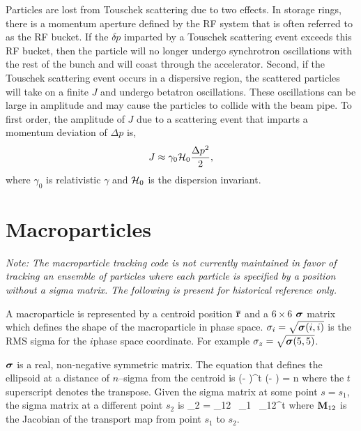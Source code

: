 Particles are lost from Touschek scattering due to two effects.  In storage rings, there is a
momentum aperture defined by the RF system that is often referred to as the RF bucket.  If the
$\delta p$ imparted by a Touschek scattering event exceeds this RF bucket, then the particle will no
longer undergo synchrotron oscillations with the rest of the bunch and will coast through the
accelerator.  Second, if the Touschek scattering event occurs in a dispersive region, the scattered
particles will take on a finite $J$ and undergo betatron oscillations.  These oscillations can be
large in amplitude and may cause the particles to collide with the beam pipe.  To first order, the
amplitude of $J$ due to a scattering event that imparts a momentum deviation of $\Delta p$ is,
\begin{equation}
  J\approx\gamma_0{\cal H}_0\frac{\Delta p^2}{2},
\end{equation}
where $\gamma_0$ is relativistic $\gamma$ and ${\cal H}_0$ is the dispersion invariant.

\section{Macroparticles}
\label{s:macro}

{\em Note: The macroparticle tracking code is not currently maintained in favor of tracking an
ensemble of particles where each particle is specified by a position without a sigma matrix. The
following is present for historical reference only.}

A macroparticle\cite{b:transport.appendix} is represented by a centroid position $\overline{{\bf r}}$ and a $6
\times 6$ $\boldsymbol{\sigma}$ matrix which defines the shape of the macroparticle in phase space. $\sigma_i =
\sqrt{\boldsymbol{\sigma}(i,i)}$ is the RMS sigma for the $i$\Th phase space coordinate. For example $\sigma_z =
\sqrt{\boldsymbol{\sigma}(5,5)}$.

$\boldsymbol{\sigma}$ is a real, non-negative symmetric matrix. The equation that defines the ellipsoid at a
distance of $n$--sigma from the centroid is
\Begineq
  (\bfr - \bfrbar)^t \bfsig\inv (\bfr - \bfrbar) = n
\Endeq
where the $t$ superscript denotes the transpose. Given the sigma matrix at some point $s = s_1$, the
sigma matrix at a different point $s_2$ is
\Begineq
  \bfsig_2 = \bfM_{12} \, \bfsig_1 \, \bfM_{12}^t
\Endeq
where ${\bf M}_{12}$ is the Jacobian of the transport map from point
$s_1$ to $s_2$.

